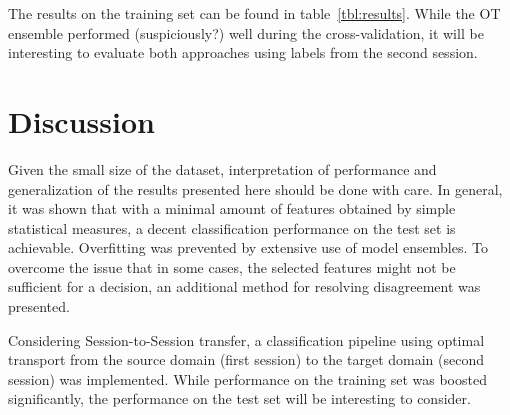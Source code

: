 \documentclass[10pt,a4paper]{article}
\begin{document}
The results on the training set can be found in table~\ref{tbl:results}.
While the OT ensemble performed (suspiciously?) well during the cross-validation, it will be interesting to evaluate both approaches using labels from the second session.

\section{Discussion}

Given the small size of the dataset, interpretation of performance and generalization of the results presented here should be done with care.
In general, it was shown that with a minimal amount of features obtained by simple statistical measures, a decent classification performance on the test set is achievable.
Overfitting was prevented by extensive use of model ensembles.
To overcome the issue that in some cases, the selected features might not be sufficient for a decision, an additional method for resolving disagreement was presented.

Considering Session-to-Session transfer, a classification pipeline using optimal transport from the source domain (first session) to the target domain (second session) was implemented.
While performance on the training set was boosted significantly, the performance on the test set will be interesting to consider.

\footnotesize



\newpage
\end{document}
